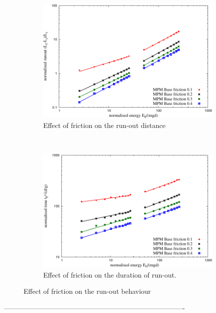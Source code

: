 \begin{figure}[tbhp]
\centering
\begin{subfigure}[b]{0.95\textwidth}
\centering
\includegraphics[width=\textwidth]{runout_fric_slope}
\caption{Effect of friction on the run-out distance}
\label{fig:runout_fric_slope}
\end{subfigure}
\\
\begin{subfigure}[b]{0.95\textwidth}
\centering
\includegraphics[width=\textwidth]{time_fric_slope}
\caption{Effect of friction on the duration of run-out.}
\label{fig:time_fric_slope}
\end{subfigure}
\caption{Effect of friction on the run-out behaviour}
\label{fig:fric_slope}
\end{figure}

-------------------------------------------------------------------------------

